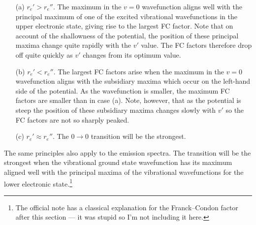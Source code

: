 \documentclass{article}
\theoremstyle{plain}\theoremheaderfont{\normalfont\itshape}\theorembodyfont{\rmfamily}\theoremseparator{.}\newtheorem*{rem}{Remark}\newtheorem*{ex}{Example}\newtheorem*{proof}{Proof}\newtheorem*{altp}{Alternative proof}
\theoremstyle{plain}\theoremheaderfont{\normalfont\bfseries}\theorembodyfont{\rmfamily}\theoremseparator{.}\newtheorem{thm}{Theorem}[section]\newtheorem{lem}[thm]{Lemma}\newtheorem{prop}[thm]{Proposition}\newtheorem*{cor}{Corollary}\newtheorem{defn}[thm]{Definition}\newtheorem{clm}[thm]{Claim}\newtheorem{clminproof}{Claim}\newtheorem{pos}{Postulate}[section]
\theoremstyle{break}\theoremheaderfont{\normalfont\itshape}\theorembodyfont{\rmfamily}\theoremseparator{.\medskip}\newtheorem*{proofskip}{Proof}\newtheorem*{exs}{Examples}\newtheorem*{rems}{Remarks}
\theoremstyle{break}\theoremheaderfont{\normalfont\bfseries}\theorembodyfont{\rmfamily}\theoremseparator{.\medskip}\newtheorem{lemskip}[thm]{Lemma}\newtheorem{defnskip}[thm]{Definition}\newtheorem{propskip}[thm]{Proposition}\newtheorem{thmskip}[thm]{Theorem}
\numberwithin{equation}{section}
\begin{document}
    \begin{enumerate}[topsep=0pt]
        \item[(a)] \(r_e'>r_e''\). The maximum in the \(v=0\) wavefunction aligns well with the principal maximum of one of the excited vibrational wavefunctions in the upper electronic state, giving rise to the largest FC factor. Note that on account of the shallowness of the potential, the position of these principal maxima change quite rapidly with the \(v'\) value. The FC factors therefore drop off quite quickly as \(v'\) changes from its optimum value.
        \item[(b)] \(r_e'<r_e''\). The largest FC factors arise when the maximum in the \(v=0\) wavefunction aligns with the subsidiary maxima which occur on the left-hand side of the potential. As the wavefunction is smaller, the maximum FC factors are smaller than in case (a). Note, however, that as the potential is steep the position of these subsidiary maxima changes slowly with \(v'\) so the FC factors are not so sharply peaked.
        \item[(c)] \(r_e'\approx r_e''\). The \(0\rightarrow 0\) transition will be the strongest.
    \end{enumerate}

    The same principles also apply to the emission spectra. The transition will be the strongest when the vibrational ground state wavefunction has its maximum aligned well with the principal maxima of the vibrational wavefunctions for the lower electronic state.\footnote{The official note has a classical explanation for the Franck--Condon factor after this section --- it was stupid so I'm not including it here.}
\end{document}
